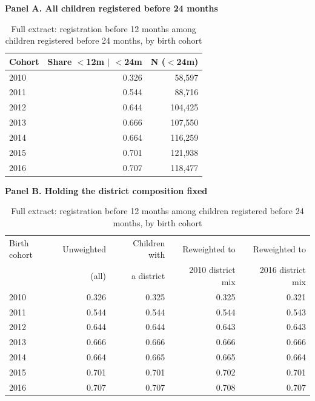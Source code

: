 \begin{table}[htbp]\centering
\caption{Full extract: registration before 12 months among children registered before 24 months, by birth cohort}
\label{tab:P5timing}
\label{tab:districtmix}
\footnotesize
\par\medskip\textbf{Panel A. All children registered before 24 months}\par\smallskip
\begin{tabular}{lrr}
\toprule
Cohort & Share $<$12m $\mid$ $<$24m & N ($<$24m) \\
\midrule
2010 & 0.326 & 58,597 \\
2011 & 0.544 & 88,716 \\
2012 & 0.644 & 104,425 \\
2013 & 0.666 & 107,550 \\
2014 & 0.664 & 116,259 \\
2015 & 0.701 & 121,938 \\
2016 & 0.707 & 118,477 \\
\bottomrule
\end{tabular}
\par\medskip\textbf{Panel B. Holding the district composition fixed}\par\smallskip
\begin{tabular}{lrrrr}
\toprule
Birth cohort & Unweighted & Children with & Reweighted to & Reweighted to \\
 & (all) & a district & 2010 district mix & 2016 district mix \\
\midrule
2010 & 0.326 & 0.325 & 0.325 & 0.321 \\
2011 & 0.544 & 0.544 & 0.544 & 0.543 \\
2012 & 0.644 & 0.644 & 0.643 & 0.643 \\
2013 & 0.666 & 0.666 & 0.666 & 0.666 \\
2014 & 0.664 & 0.665 & 0.665 & 0.664 \\
2015 & 0.701 & 0.701 & 0.702 & 0.701 \\
2016 & 0.707 & 0.707 & 0.708 & 0.707 \\
\bottomrule
\end{tabular}
\end{table}

